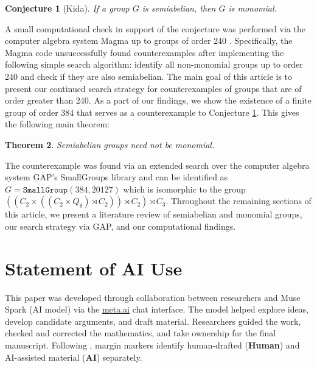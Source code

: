 \documentclass[11pt]{article}
\newcommand{\HumanLabel}{
({\bfseries\sffamily\color{humancolor!70}Human})
}
\newcommand{\AILabel}{
({\bfseries\sffamily\color{aicolor!70}AI})
}
\newtheorem{thm}{Theorem}[section]
\newtheorem{con}[thm]{Conjecture}
\theoremstyle{definition}
\numberwithin{equation}{section}
\begin{document}
\begin{humanblock}
\begin{con}[Kida]\label{conj}
If a group $G$ is semiabelian, then $G$ is monomial.
\end{con}

A small computational check in support of the conjecture was performed via the computer algebra system Magma up to groups of order 240 \cite{Kida25}. Specifically, the Magma code unsuccessfully found counterexamples after implementing the following simple search algorithm: identify all non-monomial groups up to order 240 and check if they are also semiabelian. The main goal of this article is to present our continued search strategy for counterexamples of groups that are of order greater than 240. As a part of our findings, we show the existence of a finite group of order 384 that serves as a counterexample to Conjecture \ref{conj}. This gives the following main theorem: 

\begin{thm}{\label{mainthm}}
    Semiabelian groups need not be monomial. 
\end{thm}

The counterexample was found via an extended search over the computer algebra system {\ttfamily \large GAP}'s \cite{GAP} SmallGroups library \cite{SmallGrp} and can be identified as $G = \texttt{SmallGroup}(384, 20127)$ which is isomorphic to the group $((C_2 \times ((C_2 \times Q_8) \rtimes C_2)) \rtimes C_2) \rtimes C_3$. Throughout the remaining sections of this article, we present a literature review of semiabelian and monomial groups, our search strategy via {\ttfamily \large GAP}, and our computational findings.
\end{humanblock}


\section*{Statement of AI Use}

\begin{humanblock}
This paper was developed through collaboration between researchers and Muse Spark (AI model) via the \href{http://meta.ai}{meta.ai} chat interface. The model helped explore ideas, develop candidate arguments, and draft material. Researchers guided the work, checked and corrected the mathematics, and take ownership for the final manuscript. Following \cite{schmitt2025extremal}, margin markers identify human-drafted \!\!\HumanLabel and AI-assisted material \!\!\AILabel separately.
\end{humanblock}
\end{document}
